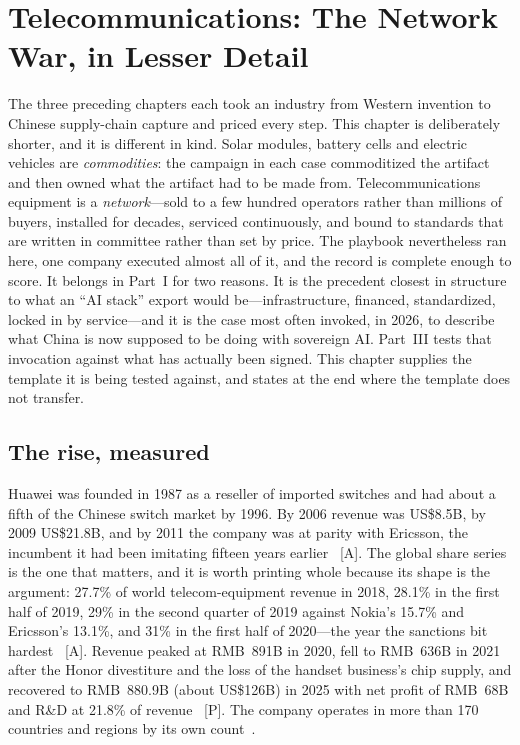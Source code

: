 \chapter{Telecommunications: The Network War, in Lesser Detail}
\label{ch:telecom}

The three preceding chapters each took an industry from Western invention to Chinese supply-chain capture and priced every step. This chapter is deliberately shorter, and it is different in kind. Solar modules, battery cells and electric vehicles are \emph{commodities}: the campaign in each case commoditized the artifact and then owned what the artifact had to be made from. Telecommunications equipment is a \emph{network}---sold to a few hundred operators rather than millions of buyers, installed for decades, serviced continuously, and bound to standards that are written in committee rather than set by price. The playbook nevertheless ran here, one company executed almost all of it, and the record is complete enough to score. It belongs in Part~I for two reasons. It is the precedent closest in structure to what an ``AI stack'' export would be---infrastructure, financed, standardized, locked in by service---and it is the case most often invoked, in 2026, to describe what China is now supposed to be doing with sovereign AI. Part~III tests that invocation against what has actually been signed. This chapter supplies the template it is being tested against, and states at the end where the template does not transfer.

\section{The rise, measured}

Huawei was founded in 1987 as a reseller of imported switches and had about a fifth of the Chinese switch market by 1996. By 2006 revenue was US\$8.5B, by 2009 US\$21.8B, and by 2011 the company was at parity with Ericsson, the incumbent it had been imitating fifteen years earlier~\cite{ahrens-huawei} [A]. The global share series is the one that matters, and it is worth printing whole because its shape is the argument: 27.7\% of world telecom-equipment revenue in 2018, 28.1\% in the first half of 2019, 29\% in the second quarter of 2019 against Nokia's 15.7\% and Ericsson's 13.1\%, and 31\% in the first half of 2020---the year the sanctions bit hardest~\cite{delloro-huawei} [A]. Revenue peaked at RMB~891B in 2020, fell to RMB~636B in 2021 after the Honor divestiture and the loss of the handset business's chip supply, and recovered to RMB~880.9B (about US\$126B) in 2025 with net profit of RMB~68B and R\&D at 21.8\% of revenue~\cite{huawei-ar-2025} [P]. The company operates in more than 170 countries and regions by its own count~\cite{huawei-ar-2025}.


